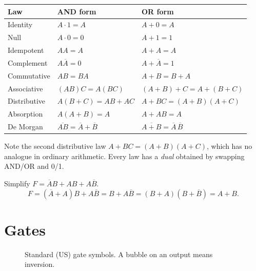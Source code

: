 \begin{center}
\begin{tabular}{lll}
\toprule
Law & AND form & OR form \\
\midrule
Identity & $A\cdot 1 = A$ & $A + 0 = A$ \\
Null & $A \cdot 0 = 0$ & $A + 1 = 1$ \\
Idempotent & $AA = A$ & $A + A = A$ \\
Complement & $A\overline{A} = 0$ & $A + \overline{A} = 1$ \\
Commutative & $AB = BA$ & $A+B = B+A$ \\
Associative & $(AB)C = A(BC)$ & $(A+B)+C = A+(B+C)$ \\
Distributive & $A(B+C) = AB+AC$ & $A + BC = (A+B)(A+C)$ \\
Absorption & $A(A+B) = A$ & $A + AB = A$ \\
De Morgan & $\overline{AB} = \overline{A}+\overline{B}$ &
  $\overline{A+B} = \overline{A}\,\overline{B}$ \\
\bottomrule
\end{tabular}
\end{center}

Note the second distributive law $A + BC = (A+B)(A+C)$, which has no
analogue in ordinary arithmetic. Every law has a \emph{dual} obtained by
swapping AND/OR and 0/1.

\begin{example}
Simplify $F = \overline{A}B + AB + A\overline{B}$.
\[
F = (\overline{A}+A)B + A\overline{B} = B + A\overline{B}
  = (B + A)(B + \overline{B}) = A + B.
\]
\end{example}

\section{Gates}

\begin{figure}[H]
\centering
{}
\caption{Standard (US) gate symbols. A bubble on an output means inversion.}
\end{figure}

